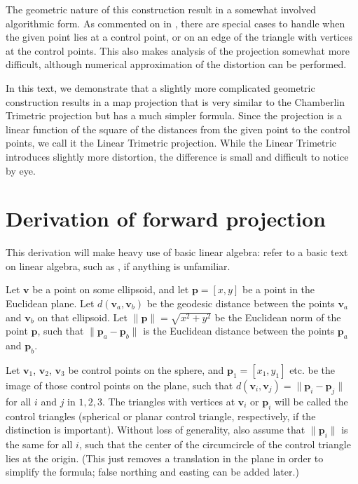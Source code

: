 \documentclass{amsart}[12pt]
\begin{document}
The geometric nature of this construction result in a somewhat involved
algorithmic form. As commented on in \cite{christensen}, there are special
cases to handle when the given point lies at a control point, or on an edge of
the triangle with vertices at the control points. This also makes analysis of
the projection somewhat more difficult, although numerical approximation of the
distortion can be performed.

In this text, we demonstrate that a slightly more complicated geometric
construction results in a map projection that is very similar to the
Chamberlin Trimetric projection but has a much simpler formula. Since the
projection is a linear function of the square of the distances from the given
point to the control points, we call it the Linear Trimetric projection. While
the Linear Trimetric introduces slightly more distortion, the difference is
small and difficult to notice by eye.

\section{Derivation of forward projection}
This derivation will make heavy use of basic linear algebra: refer to a basic
text on linear algebra, such as \cite{strang80}, if anything is
unfamiliar.

Let $\mathbf v$ be a point on some ellipsoid, and let $\mathbf p = [x, y]$
be a point in the Euclidean plane. Let $d(\mathbf v_a, \mathbf v_b)$ be the
geodesic distance between the points $\mathbf v_a$ and $\mathbf v_b$ on that
ellipsoid. Let $\|\mathbf p\| = \sqrt{x^2 + y^2}$ be the Euclidean norm of the point
$\mathbf p$, such that $\|\mathbf p_a - \mathbf p_b\|$
is the Euclidean distance between the points $\mathbf p_a$ and $\mathbf p_b$.

Let $\mathbf v_1$, $\mathbf v_2$, $\mathbf v_3$ be control points on the sphere,
and $\mathbf p_1 = [x_1, y_1]$ etc. be the image of those control points on the
plane, such that $d(\mathbf v_i, \mathbf v_j) = \|\mathbf p_i - \mathbf p_j\|$
for all $i$ and $j$ in ${1, 2, 3}$. The triangles with vertices at $\mathbf v_i$
or $\mathbf p_i$ will be called the control triangles (spherical or planar
control triangle, respectively, if the distinction is important). Without loss
of generality, also assume that $\|\mathbf p_i\|$ is the same for all $i$, such
that the center of the circumcircle of the control triangle lies at the origin.
(This just removes a translation in the plane in order to simplify the formula;
false northing and easting can be added later.)
\end{document}
